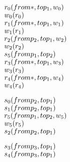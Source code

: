 \newcommand{\reduce}[1]{\ensuremath{\rightarrow_{#1}}}

\newsavebox{\boxTZero}
\begin{lrbox}{\boxTZero}
\begin{minipage}[t]{0.4\linewidth}
\large
\begin{alltt}
\(r\sb{0}(from \ast, to p\sb{1}, w\sb{0})\)
\(w\sb{0}(r\sb{0})\)
\(r\sb{1}(from \ast, to p\sb{1}, w\sb{1})\)
\(w\sb{1}(r\sb{1})\)
\(r\sb{2}(from p\sb{2}, to p\sb{1}, w\sb{2})\)
\(w\sb{2}(r\sb{2})\)
\(s\sb{5}(from p\sb{1}, to p\sb{2})\)
\(r\sb{3}(from \ast, to p\sb{1}, w\sb{3})\)
\(w\sb{3}(r\sb{3})\)
\(r\sb{4}(from \ast, to p\sb{1}, w\sb{4})\)
\(w\sb{4}(r\sb{4})\)
\end{alltt}
\end{minipage}
\end{lrbox}

\newsavebox{\boxTOne}
\begin{lrbox}{\boxTOne}
\begin{minipage}[t]{0.4\linewidth}
\large
\begin{alltt}
\(s\sb{0}(from p\sb{2}, to p\sb{1})\)
\(s\sb{1}(from p\sb{2}, to p\sb{1})\)
\(r\sb{5}(from p\sb{1}, to p\sb{2}, w\sb{5})\)
\(w\sb{5}(r\sb{5})\)
\(s\sb{2}(from p\sb{2}, to p\sb{1})\)
\end{alltt}
\end{minipage}
\end{lrbox}

\newsavebox{\boxTTwo}
\begin{lrbox}{\boxTTwo}
\begin{minipage}[t]{0.4\linewidth}
\large
\begin{alltt}
\(s\sb{3}(from p\sb{3}, to p\sb{1})\)
\(s\sb{4}(from p\sb{3}, to p\sb{1})\)
\end{alltt}
\end{minipage}
\end{lrbox}


\newcommand\examplefigone{
\begin{figure*}[tb]
\begin{center}
\setlength{\tabcolsep}{2pt}
\begin{tabular}[t]{c|c|c}
$\mathit{p_1}$ & $\mathit{p_2}$ & $\mathit{p_3}$ \\
\hline
\scalebox{0.8}{\usebox{\boxTZero}}&
\scalebox{0.8}{\usebox{\boxTOne}} &
\scalebox{0.8}{\usebox{\boxTTwo}}
\end{tabular}
\end{center}
\caption{A simple concurrent trace program.}
\label{fig:example}
\end{figure*}
}

